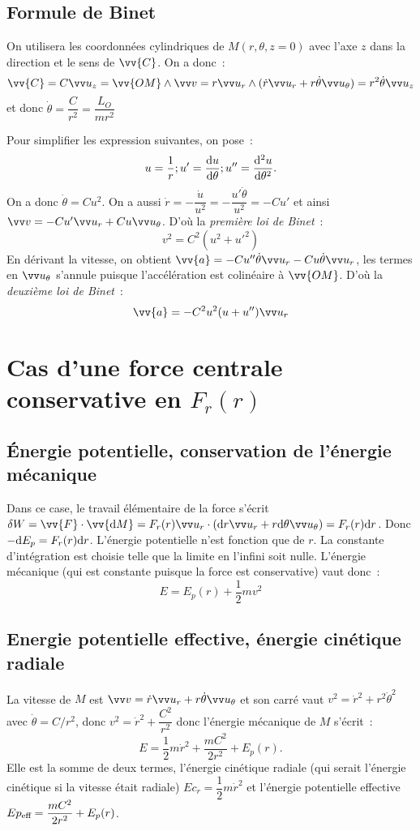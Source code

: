 \subsection{Formule de Binet}
On utilisera les coordonnées cylindriques de \(M(r, \theta, z=0)\) avec l'axe 
\(z\) dans la direction et le sens de \(\vv{C}\). On a donc~:
\[\vv{C} = C \uz = \vv{OM} \wedge \vvv = r \ur \wedge (\dot{r}\ur + 
r\dot{\theta} \utheta) = r^2\dot{\theta} \uz\]
et donc \(\dot{\theta} = \dfrac{C}{r^2} = \dfrac{L_O}{mr^2}\)

Pour simplifier les expression suivantes, on pose~:
\[u = \dfrac{1}{r} ; u'=\dfrac{\mathrm{d} u}{\mathrm{d} \theta} ; u''=\dfrac{\mathrm{d}^2 u}{\mathrm{d} {\theta}^2}.\]
On a donc \(\dot{\theta} = Cu^2\). On a aussi \(\dot{r} = -\dfrac{\dot{u}}{u^2} 
= -\dfrac{u' \dot{\theta}}{u^2} = -Cu'\) et ainsi \(\vvv = -Cu' \ur + Cu 
\utheta\). D'où la \emph{première loi de Binet}~:
\begin{equation}
  v^2 = C^2(u^2 + u'^2)
\end{equation}
En dérivant la vitesse, on obtient \(\vv{a} = -Cu''\dot{\theta}\ur 
-Cu\dot{\theta}\ur\), les termes en \(\utheta\) s'annule puisque l'accélération 
est colinéaire à \(\vv{OM}\). D'où la \emph{deuxième loi de Binet}~:
\begin{equation}
  \vv{a} = -C^2u^2(u+u'')\ur
\end{equation}
\section{Cas d'une force centrale conservative en \(F_r(r)\)}
\subsection{Énergie potentielle, conservation de l'énergie mécanique}
Dans ce case, le travail élémentaire de la force s'écrit \(\delta{}W = 
\vv{F}\cdot\vv{\D{M}} = F_r(r)\ur\cdot(\D{r}\ur + r\D{\theta}\utheta) = 
F_r(r)\D{r}\). Donc \(-\mathrm{d}{E_p} = F_r(r)\mathrm{d}{r}\). L'énergie potentielle n'est 
fonction que de \(r\). La constante d'intégration est choisie telle que la 
limite en l'infini soit nulle. L'énergie mécanique (qui est constante puisque 
la force est conservative) vaut donc~:
\[E = E_p(r) + \dfrac{1}{2} mv^2\]

\subsection{Energie potentielle effective, énergie cinétique radiale}
La vitesse de \(M\) est \(\vvv = \dot{r}\ur + r\dot{\theta}\utheta\) et son 
carré vaut \(v^2 = \dot{r}^2 + r^2\dot{\theta}^2\) avec \(\dot{\theta} = 
C/r^2\), donc \(v^2 = \dot{r}^2 + \dfrac{C^2}{r^2}\) donc l'énergie mécanique 
de \(M\) s'écrit~:
\[E = \dfrac{1}{2}m\dot{r}^2 + \dfrac{mC^2}{2r^2} + E_p(r).\]
Elle est la somme de deux termes, l'énergie cinétique radiale (qui serait 
l'énergie cinétique si la vitesse était radiale) \(Ec_r = 
\dfrac{1}{2}m\dot{r}^2\) et l'énergie potentielle 
effective \(Ep_{\textmd{eff}} = \dfrac{mC^2}{2r^2} + E_p(r)\).

